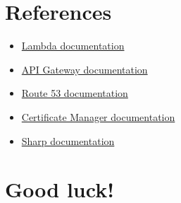 \documentclass{article}
\begin{document}
\section{References}\label{references}
\begin{itemize}
\item \href{https://docs.aws.amazon.com/lambda/latest/dg/welcome.html}{Lambda documentation}
\item \href{https://docs.aws.amazon.com/apigateway/latest/developerguide/welcome.html}{API Gateway documentation}
\item \href{https://docs.aws.amazon.com/Route53/latest/DeveloperGuide/Welcome.html}{Route 53 documentation}
\item \href{https://docs.aws.amazon.com/acm/latest/userguide/acm-overview.html}{Certificate Manager documentation}
\item \href{https://sharp.pixelplumbing.com/}{Sharp documentation}
\end{itemize}
\section*{Good luck!}
\end{document}
